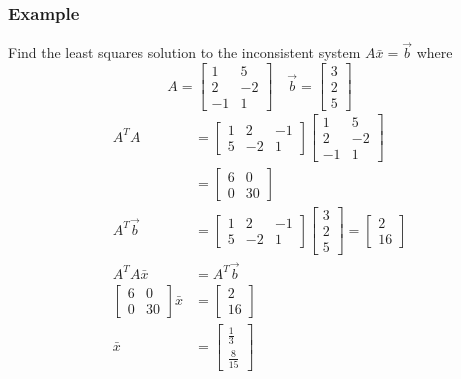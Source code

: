 \documentclass{math}
\begin{document}
\subsubsection*{Example}
Find the least squares solution to the inconsistent system \( A\bar{x} =
\vec{b} \) where
\[ A = \begin{bmatrix}
  1 & 5 \\
  2 & -2 \\
  -1 & 1
\end{bmatrix} \quad \vec{b} = \begin{bmatrix}3 \\ 2 \\ 5\end{bmatrix} \]
\begin{align*}
  A^TA &= \begin{bmatrix}
    1 & 2 & -1 \\
    5 & -2 & 1
  \end{bmatrix}\begin{bmatrix}
    1 & 5 \\
    2 & -2 \\
    -1 & 1
  \end{bmatrix} \\
  &= \begin{bmatrix}
    6 & 0 \\
    0 & 30
  \end{bmatrix} \\
  A^T\vec{b} &= \begin{bmatrix}
    1 & 2 & -1 \\
    5 & -2 & 1
  \end{bmatrix}\begin{bmatrix}3 \\ 2 \\ 5\end{bmatrix} = \begin{bmatrix}
    2 \\ 16
  \end{bmatrix} \\
  A^TA\bar{x} &= A^T\vec{b} \\
  \begin{bmatrix}
    6 & 0 \\
    0 & 30
  \end{bmatrix}\bar{x} &= \begin{bmatrix}2 \\ 16\end{bmatrix} \\
  \bar{x} &= \begin{bmatrix}
    \frac{1}{3} \\ \frac{8}{15}
  \end{bmatrix}
\end{align*}
\end{document}
